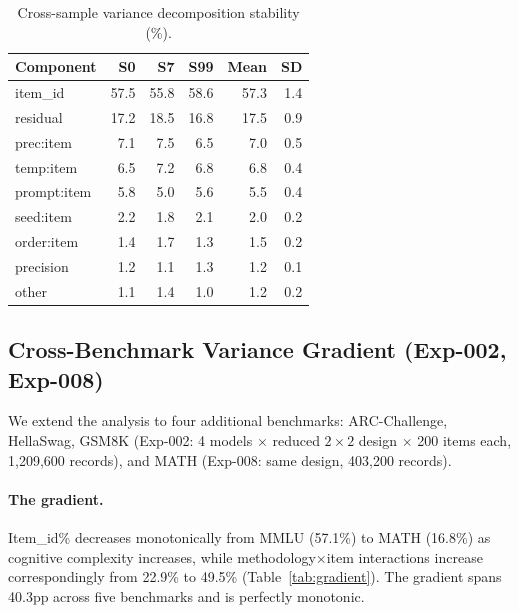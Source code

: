 \documentclass[11pt,twocolumn]{article}
\begin{document}
\begin{table}[t]
\centering
\caption{Cross-sample variance decomposition stability (\%).}
\label{tab:stability}
\small
\begin{tabular}{lRRRRR}
\toprule
Component & \footnotesize{S0} & \footnotesize{S7} & \footnotesize{S99} & \footnotesize{Mean} & \footnotesize{SD} \\
\midrule
item\_id & 57.5 & 55.8 & 58.6 & 57.3 & 1.4 \\
residual & 17.2 & 18.5 & 16.8 & 17.5 & 0.9 \\
prec:item & 7.1 & 7.5 & 6.5 & 7.0 & 0.5 \\
temp:item & 6.5 & 7.2 & 6.8 & 6.8 & 0.4 \\
prompt:item & 5.8 & 5.0 & 5.6 & 5.5 & 0.4 \\
seed:item & 2.2 & 1.8 & 2.1 & 2.0 & 0.2 \\
order:item & 1.4 & 1.7 & 1.3 & 1.5 & 0.2 \\
precision & 1.2 & 1.1 & 1.3 & 1.2 & 0.1 \\
other & 1.1 & 1.4 & 1.0 & 1.2 & 0.2 \\
\bottomrule
\end{tabular}
\end{table}

\subsection{Cross-Benchmark Variance Gradient (Exp-002, Exp-008)}
\label{sec:gradient}

We extend the analysis to four additional benchmarks: ARC-Challenge, HellaSwag, GSM8K (Exp-002: 4 models $\times$ reduced $2 \times 2$ design $\times$ 200 items each, 1{,}209{,}600 records), and MATH (Exp-008: same design, 403{,}200 records).

\paragraph{The gradient.}
Item\_id\% decreases monotonically from MMLU (57.1\%) to MATH (16.8\%) as cognitive complexity increases, while methodology$\times$item interactions increase correspondingly from 22.9\% to 49.5\% (Table~\ref{tab:gradient}).
The gradient spans 40.3pp across five benchmarks and is perfectly monotonic.
\end{document}
